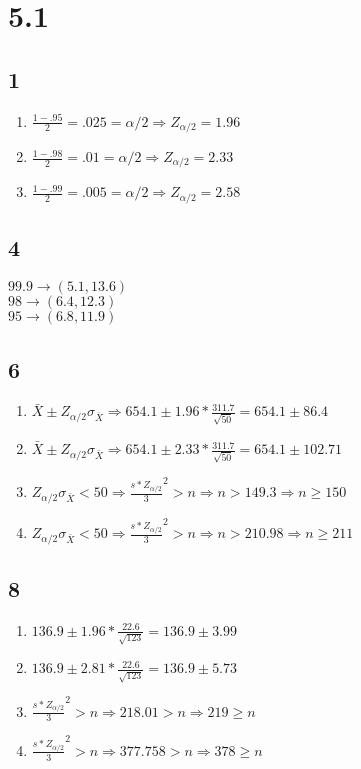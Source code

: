 \documentclass[12pt]{report}
\begin{document}
\section*{5.1}
   \subsection*{1}
   \begin{enumerate}[label={\bf \alph*}]
   \item $\frac{1-.95}{2}=.025= \alpha/2 \Rightarrow Z_{\alpha/2} = 1.96$\\
   \item $\frac{1-.98}{2}=.01= \alpha/2 \Rightarrow Z_{\alpha/2} = 2.33$
   \item $\frac{1-.99}{2}=.005= \alpha/2 \Rightarrow Z_{\alpha/2} = 2.58$
   \end{enumerate}
   \subsection*{4}
    $99.9\rightarrow (5.1, 13.6)$\\
   $98\rightarrow (6.4,12.3)$\\
     $95\rightarrow(6.8, 11.9)$\\      
   \subsection*{6}
   \begin{enumerate}[label={\bf \alph*}]
   \item $\bar{X} \pm Z_{\alpha/2} \sigma_{\bar{X}} \Rightarrow 654.1 \pm 1.96*\frac{311.7}{\sqrt{50}} =  654.1 \pm 86.4 $
   \item $\bar{X} \pm Z_{\alpha/2} \sigma_{\bar{X}} \Rightarrow 654.1 \pm 2.33*\frac{311.7}{\sqrt{50}}=  654.1 \pm 102.71 $\addtocounter{enumi}{1}
   \item $Z_{\alpha/2} \sigma_{\bar{X}} < 50 \Rightarrow \frac{s*{Z_{\alpha/2}}}{3}^2>n \Rightarrow n > 149.3\Rightarrow n\geq 150$
   \item $Z_{\alpha/2} \sigma_{\bar{X}} < 50 \Rightarrow \frac{s*{Z_{\alpha/2}}}{3}^2>n \Rightarrow n > 210.98\Rightarrow n\geq 211$
   \end{enumerate}
   \subsection*{8}
      \begin{enumerate}[label={\bf \alph*}]
   \item $136.9\pm1.96*\frac{22.6}{\sqrt{123}}=136.9\pm3.99$
   \item $136.9\pm2.81*\frac{22.6}{\sqrt{123}}=136.9\pm5.73$\addtocounter{enumi}{1}
   \item $\frac{s*{Z_{\alpha/2}}}{3}^2>n \Rightarrow 218.01>n \Rightarrow 219\geq n$
   \item $\frac{s*{Z_{\alpha/2}}}{3}^2>n \Rightarrow 377.758>n \Rightarrow 378\geq n$
   \end{enumerate}
\end{document}
